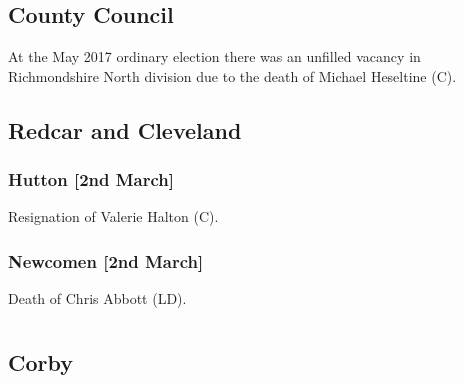 \documentclass[a4paper,openany]{book}
\begin{document}
\begin{resultsiii}
\section[North Yorkshire]{}

\subsection*{County Council}

At the May 2017 ordinary election there was an unfilled vacancy in Richmondshire North division due to the death of Michael Heseltine (C).

\subsection*{Redcar and Cleveland}

\subsubsection*{Hutton \hspace*{\fill}\nolinebreak[1]%
\enspace\hspace*{\fill}
[2nd March]}


Resignation of Valerie Halton (C).

\subsubsection*{Newcomen \hspace*{\fill}\nolinebreak[1]%
\enspace\hspace*{\fill}
[2nd March]}


Death of Chris Abbott (LD).

\section[Northamptonshire]{}

\subsection*{Corby}


\end{resultsiii}
\end{document}

